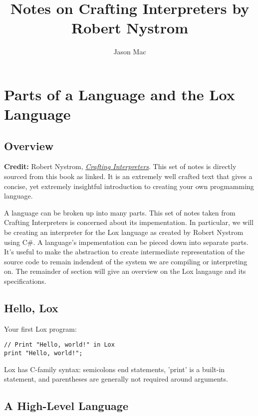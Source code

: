 \documentclass[12pt,a4paper]{article}
\title{Notes on Crafting Interpreters by Robert Nystrom}
\author{Jason Mac}
\begin{document}
\maketitle
\tableofcontents
\newpage

\section{Parts of a Language and the Lox Language}

\subsection{Overview}


\textbf{Credit:} Robert Nystrom,
\href{https://craftinginterpreters.com/}{\textit{Crafting Interpreters}}.
This set of notes is directly sourced from this book as linked.
It is an extremely well crafted text that gives a concise, yet extremely insightful introduction to
creating your own progmamming language.

A language can be broken up into many parts. This set of notes taken from Crafting Interpreters is concerned about its impementation.
In particular, we will be creating an interpreter for the Lox language as created by Robert Nystrom using C\#.
A language's impementation can be pieced down into separate parts. It's useful to make the abstraction to create intermediate representation
of the source code to remain indendent of the system we are compiling or interpreting on.
The remainder of section will give an overview on the Lox langauge and its specifications.



\subsection{Hello, Lox}

Your first Lox program:

\begin{lstlisting}
// Print "Hello, world!" in Lox
print "Hello, world!";
\end{lstlisting}

Lox has C-family syntax: semicolons end statements, 'print' is a built-in statement, and parentheses are generally not required around arguments.

\subsection{A High-Level Language}
\end{document}
